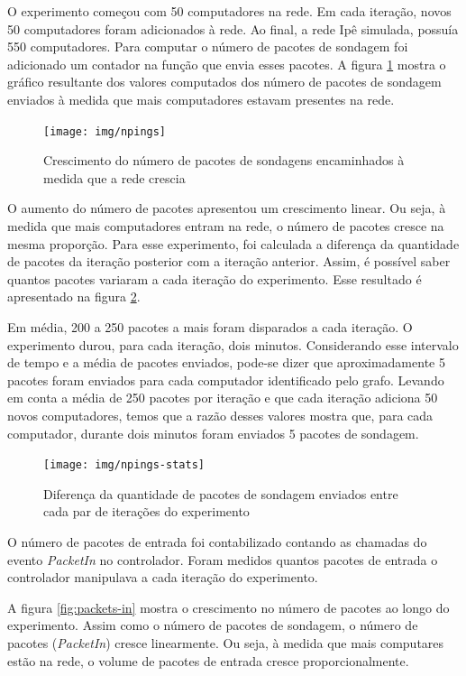 O experimento começou com 50 computadores na rede.
Em cada iteração, novos 50 computadores foram adicionados à rede.
Ao final, a rede Ipê simulada, possuía 550 computadores.
Para computar o número de pacotes de sondagem foi adicionado um contador
na função que envia esses pacotes.
A figura \ref{fig:npings} mostra o gráfico resultante dos valores computados
dos número de pacotes de sondagem enviados à medida que mais computadores
estavam presentes na rede.

\begin{figure}[!htb]
    \centering
    \label{fig:npings}
    \texttt{[image: img/npings]}
    \caption{Crescimento do número de pacotes de sondagens encaminhados
        à medida que a rede crescia}
\end{figure}

O aumento do número de pacotes apresentou um crescimento linear.
Ou seja, à medida que mais computadores entram na rede, o número de pacotes
cresce na mesma proporção.
Para esse experimento, foi calculada a diferença da quantidade de pacotes da
iteração posterior com a iteração anterior.
Assim, é possível saber quantos pacotes variaram a cada iteração do
experimento.
Esse resultado é apresentado na figura \ref{fig:npings-stats}.

Em média, 200 a 250 pacotes a mais foram disparados a cada iteração.
O experimento durou, para cada iteração, dois minutos.
Considerando esse intervalo de tempo e a média de pacotes enviados, pode-se
dizer que aproximadamente 5 pacotes foram enviados para cada computador
identificado pelo grafo.
Levando em conta a média de 250 pacotes por iteração e que cada iteração
adiciona 50 novos computadores, temos que a razão desses valores mostra
que, para cada computador, durante dois minutos foram enviados 5 pacotes
de sondagem.

\begin{figure}[!htb]
    \centering
    \label{fig:npings-stats}
    \texttt{[image: img/npings-stats]}
    \caption{Diferença da quantidade de pacotes de sondagem enviados entre
    cada par de iterações do experimento}
\end{figure}

O número de pacotes de entrada foi contabilizado contando as chamadas do
evento \emph{PacketIn} no controlador.
Foram medidos quantos pacotes de entrada o controlador manipulava a cada
iteração do experimento.

A figura \ref{fig:packets-in} mostra o crescimento no número de pacotes ao
longo do experimento.
Assim como o número de pacotes de sondagem, o número de pacotes
(\emph{PacketIn}) cresce linearmente.
Ou seja, à medida que mais computares estão na rede, o volume de pacotes de
entrada cresce proporcionalmente.

